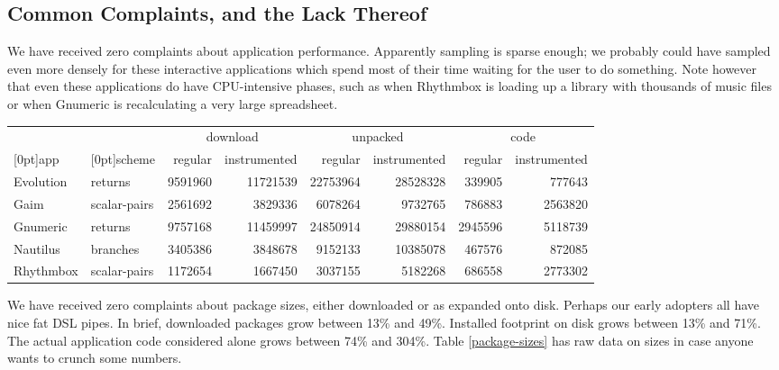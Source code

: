\documentclass[10pt,twocolumn]{article}
\begin{document}
\subsection{Common Complaints, and the Lack Thereof}

We have received zero complaints about application performance.
Apparently  sampling is sparse enough; we probably
could have sampled even more densely for these interactive
applications which spend most of their time waiting for the user to do
something.  Note however that even these applications do have
CPU-intensive phases, such as when Rhythmbox is loading up a library
with thousands of music files or when Gnumeric is recalculating a very
large spreadsheet.

\begin{table*}
  \centering
  \begin{tabular}{|l|l|rr|rr|rr|}
    & & \multicolumn{2}{c|}{download} & \multicolumn{2}{c|}{unpacked} & \multicolumn{2}{c|}{code} \\
    \raisebox{1.5ex}[0pt]{app} & \raisebox{1.5ex}[0pt]{scheme} & regular & instrumented & regular & instrumented & regular & instrumented \\ \hline
    Evolution & returns & 9591960 & 11721539 & 22753964 & 28528328 & 339905 & 777643 \\
    Gaim & scalar-pairs & 2561692 & 3829336 & 6078264 & 9732765 & 786883 & 2563820 \\
    Gnumeric & returns & 9757168 & 11459997 & 24850914 & 29880154 & 2945596 & 5118739 \\
    Nautilus & branches & 3405386 & 3848678 & 9152133 & 10385078 & 467576 & 872085 \\
    Rhythmbox & scalar-pairs & 1172654 & 1667450 & 3037155 & 5182268 & 686558 & 2773302
  \end{tabular}
  \caption{Sizes of regular and instrumented packages.  Sizes are in
    bytes.  ``Download'' is the size of the complete RPM package,
    whose contents are compressed.  ``Unpacked'' is the size as
    installed on disk, without that compression. ``Code'' is just the
    size of the code for the main instrumented executable.}
  \label{package-sizes}
\end{table*}

We have received zero complaints about package sizes, either
downloaded or as expanded onto disk.  Perhaps our early adopters all
have nice fat DSL pipes.  In brief, downloaded packages grow between
13\% and 49\%.  Installed footprint on disk grows between 13\% and
71\%.  The actual application code considered alone grows between 74\%
and 304\%.  Table \ref{package-sizes} has raw data on sizes in case
anyone wants to crunch some numbers.
\end{document}
